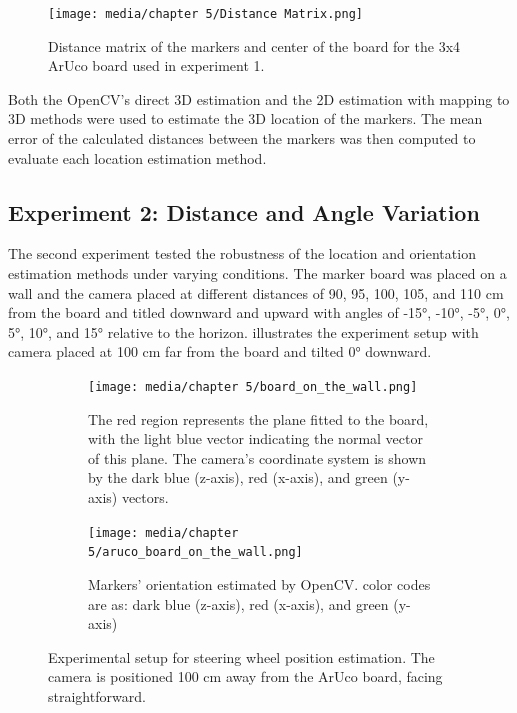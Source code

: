 \begin{figure}[htpb]
    \centering
    \texttt{[image: media/chapter 5/Distance Matrix.png]}
    \caption{Distance matrix of the markers and center of the board for the 3x4 ArUco board used in experiment 1.}
    \label{fig:distance_matrix}
\end{figure}

Both the OpenCV's direct 3D estimation and the 2D estimation with mapping to 3D methods were used to estimate the 3D location of the markers. The mean error of the calculated distances between the markers was then computed to evaluate each location estimation method.

\subsection{Experiment 2: Distance and Angle Variation}
The second experiment tested the robustness of the location and orientation estimation methods under varying conditions. The marker board was placed on a wall and the camera placed at different distances of  90, 95, 100, 105, and 110 cm from the board and titled downward and upward with angles of -15°, -10°, -5°, 0°, 5°, 10°, and 15° relative to the horizon.  illustrates the experiment setup with camera placed at 100 cm far from the board and tilted 0° downward. 

\begin{figure}[htpb]
    \centering
    \begin{subfigure}[t]{0.45\textwidth}
        \centering
        \texttt{[image: media/chapter 5/board\_on\_the\_wall.png]}
        \caption{The red region represents the plane fitted to the board, with the light blue vector indicating the normal vector of this plane. The camera’s coordinate system is shown by the dark blue (z-axis), red (x-axis), and green (y-axis) vectors.}
        \label{fig:board_on_wall_plain_fitting}
    \end{subfigure}\hfill
    \begin{subfigure}[t]{0.45\textwidth}
        \centering
        \texttt{[image: media/chapter 5/aruco\_board\_on\_the\_wall.png]}
        \caption{Markers' orientation estimated by OpenCV. color codes are as: dark blue (z-axis), red (x-axis), and green (y-axis)}
        \label{fig:board_on_wall_opencv}
    \end{subfigure}
    \caption{Experimental setup for steering wheel position estimation. The camera is positioned 100 cm away from the ArUco board, facing straightforward.}
\end{figure}

